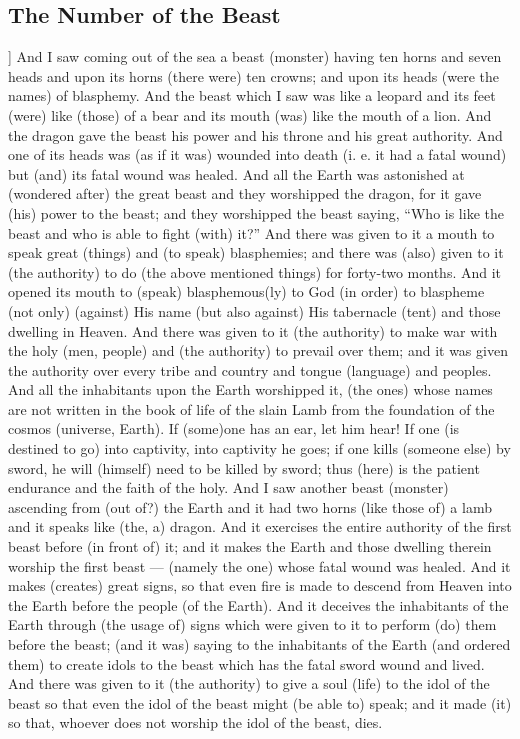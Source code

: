 \begin{pages}
\begin{Leftside}
        			\chapter{The Number of the Beast}
				]		
		And I saw coming out of the sea a beast (monster) having ten horns and seven heads and upon its horns (there were) ten crowns; and upon its heads (were the names) of blasphemy. And the beast which I saw was like a leopard and its feet (were) like (those) of a bear and its mouth (was) like the mouth of a lion. And the dragon gave the beast his power and his throne and his great authority. 
		\pend
		\pstart
		And one of its heads was (as if it was) wounded into death (i. e. it had a fatal wound) but (and) its fatal wound was healed. And all the Earth was astonished at (wondered after) the great beast and they worshipped the dragon, for it gave (his) power to the beast; and they worshipped the beast saying, “Who is like the beast and who is able to fight (with) it?” 
		\pend
		\pstart
		And there was given to it a mouth to speak great (things) and (to speak) blasphemies; and there was (also) given to it (the authority) to do (the above mentioned things) for forty-two months. And it opened its mouth to (speak) blasphemous(ly) to God (in order) to blaspheme (not only) (against) His name (but also against) His tabernacle (tent) and those dwelling in Heaven. 
		\pend
		\pstart
		And there was given to it (the authority) to make war with the holy (men, people) and (the authority) to prevail over them; and it was given the authority over every tribe and country and tongue (language) and peoples. And all the inhabitants upon the Earth worshipped it, (the ones) whose names are not written in the book of life of the slain Lamb from the foundation of the cosmos (universe, Earth). If (some)one has an ear, let him hear! If one (is destined to go) into captivity, into captivity he goes; if one kills (someone else) by sword, he will (himself) need to be killed by sword; thus (here) is the patient endurance and the faith of the holy. 
		\pend
		\pstart
		And I saw another beast (monster) ascending from (out of?) the Earth and it had two horns (like those of) a lamb and it speaks like (the, a) dragon. And it exercises the entire authority of the first beast before (in front of) it; and it makes the Earth and those dwelling therein worship the first beast — (namely the one) whose fatal wound was healed. And it makes (creates) great signs, so that even fire is made to descend from Heaven into the Earth before the people (of the Earth). 
		\pend
		\pstart	
		And it deceives the inhabitants of the Earth through (the usage of) signs which were given to it to perform (do) them before the beast; (and it was) saying to the inhabitants of the Earth (and ordered them) to create idols to the beast which has the fatal sword wound and lived. And there was given to it (the authority) to give a soul (life) to the idol of the beast so that even the idol of the beast might (be able to) speak; and it made (it) so that, whoever does not worship the idol of the beast, dies. 

\end{Leftside}
\end{pages}
